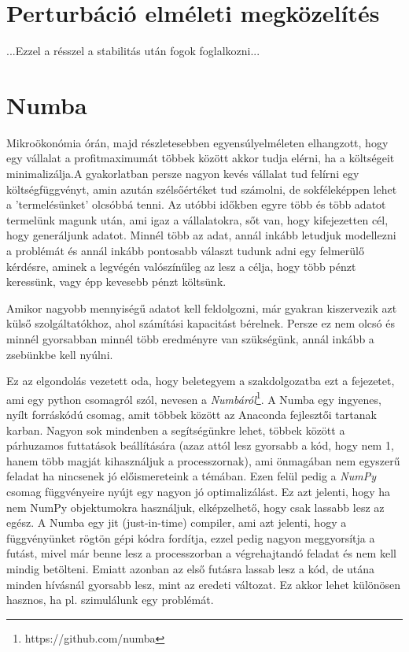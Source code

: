 \documentclass{article}
\theoremstyle{definition}
\theoremstyle{theorem}
\begin{document}
\section{Perturbáció elméleti megközelítés}
...Ezzel a résszel a stabilitás után fogok foglalkozni...
\section{Numba}
Mikroökonómia órán, majd részletesebben egyensúlyelméleten elhangzott, hogy egy vállalat a profitmaximumát többek között akkor tudja elérni, ha a költségeit minimalizálja.A gyakorlatban persze nagyon kevés vállalat tud felírni egy költségfüggvényt, amin azután szélsőértéket tud számolni, de sokféleképpen lehet a 'termelésünket' olcsóbbá tenni. Az utóbbi időkben egyre több és több adatot termelünk magunk után, ami igaz a vállalatokra, sőt van, hogy kifejezetten cél, hogy generáljunk adatot. Minnél több az adat, annál inkább letudjuk modellezni a problémát és annál inkább pontosabb választ tudunk adni egy felmerülő kérdésre, aminek a legvégén valószínűleg az lesz a célja, hogy több pénzt keressünk, vagy épp kevesebb pénzt költsünk.

Amikor nagyobb mennyiségű adatot kell feldolgozni, már gyakran kiszervezik azt külső szolgáltatókhoz, ahol számítási kapacitást bérelnek. Persze ez nem olcsó és minnél gyorsabban minnél több eredményre van szükségünk, annál inkább a zsebünkbe kell nyúlni.

Ez az elgondolás vezetett oda, hogy beletegyem a szakdolgozatba ezt a fejezetet, ami egy python csomagról szól, nevesen a \textit{Numbáról}\footnote{https://github.com/numba}.
\newline
A Numba egy ingyenes, nyílt forráskódú csomag, amit többek között az Anaconda fejlesztői tartanak karban. Nagyon sok mindenben a segítségünkre lehet, többek között a párhuzamos futtatások beállítására (azaz attól lesz gyorsabb a kód, hogy nem 1, hanem több magját kihasználjuk a processzornak), ami önmagában nem egyszerű feladat ha nincsenek jó előismereteink a témában. Ezen felül pedig a \textit{NumPy} csomag függvényeire nyújt egy nagyon jó optimalizálást. Ez azt jelenti, hogy ha nem NumPy objektumokra használjuk, elképzelhető, hogy csak lassabb lesz az egész.\newline
A Numba egy jit (just-in-time) compiler, ami azt jelenti, hogy a függvényünket rögtön gépi kódra fordítja, ezzel pedig nagyon meggyorsítja a futást, mivel már benne lesz a processzorban a végrehajtandó feladat és nem kell mindig betölteni. Emiatt azonban az első futásra lassab lesz a kód, de utána minden hívásnál gyorsabb lesz, mint az eredeti változat. Ez akkor lehet különösen hasznos, ha pl. szimulálunk egy problémát.
\end{document}
